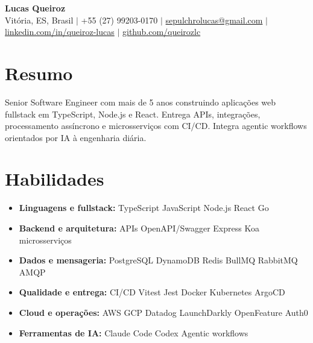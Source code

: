 \documentclass[letterpaper,10pt]{article}
\newcommand{\resumeItem}[1]{\item\small{#1}}
\newcommand{\resumeSubHeadingList}{\begin{itemize}[leftmargin=0.15in, label={}, nosep]}
\newcommand{\resumeSubHeadingListEnd}{\end{itemize}}
\begin{document}
\begin{center}
  \textbf{\Huge Lucas Queiroz} \\[3pt]
  \small Vit\'oria, ES, Brasil $|$ +55 (27) 99203-0170 $|$ \href{mailto:sepulchrolucas@gmail.com}{sepulchrolucas@gmail.com} $|$
  \href{https://linkedin.com/in/queiroz-lucas}{linkedin.com/in/queiroz-lucas} $|$
  \href{https://github.com/queirozlc}{github.com/queirozlc}
\end{center}
\vspace{2pt}

\section{Resumo}
Senior Software Engineer com mais de 5 anos construindo aplica\c{c}\~oes web fullstack em TypeScript, Node.js e React. Entrega APIs, integra\c{c}\~oes, processamento ass\'incrono e microsservi\c{c}os com CI/CD. Integra agentic workflows orientados por IA \`a engenharia di\'aria.

\section{Habilidades}
\resumeSubHeadingList
\resumeItem{\textbf{Linguagens e fullstack:} TypeScript \textbar{} JavaScript \textbar{} Node.js \textbar{} React \textbar{} Go}
\resumeItem{\textbf{Backend e arquitetura:} APIs \textbar{} OpenAPI/Swagger \textbar{} Express \textbar{} Koa \textbar{} microsservi\c{c}os}
\resumeItem{\textbf{Dados e mensageria:} PostgreSQL \textbar{} DynamoDB \textbar{} Redis \textbar{} BullMQ \textbar{} RabbitMQ \textbar{} AMQP}
\resumeItem{\textbf{Qualidade e entrega:} CI/CD \textbar{} Vitest \textbar{} Jest \textbar{} Docker \textbar{} Kubernetes \textbar{} ArgoCD}
\resumeItem{\textbf{Cloud e opera\c{c}\~oes:} AWS \textbar{} GCP \textbar{} Datadog \textbar{} LaunchDarkly \textbar{} OpenFeature \textbar{} Auth0}
\resumeItem{\textbf{Ferramentas de IA:} Claude Code \textbar{} Codex \textbar{} Agentic workflows}\resumeSubHeadingListEnd
\end{document}
